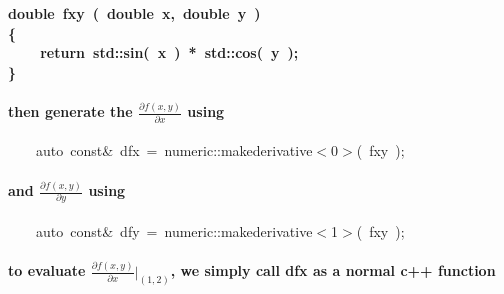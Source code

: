 \documentclass[9pt,onside,a4paper]{article}
\newcommand{\hlstd}[1]{\textcolor[rgb]{0.2,0,0.4}{#1}}
\newcommand{\hlnum}[1]{\textcolor[rgb]{0.2,0.73,0.02}{#1}}
\newcommand{\hlopt}[1]{\textcolor[rgb]{0.33,0.33,0.33}{#1}}
\newcommand{\hlkwa}[1]{\textcolor[rgb]{1,0.19,0.19}{#1}}
\newcommand{\hlkwb}[1]{\textcolor[rgb]{0.96,0.55,0.14}{#1}}
\newcommand{\hlkwc}[1]{\textcolor[rgb]{0,0,1}{#1}}
\newcommand{\hlkwd}[1]{\textcolor[rgb]{0.82,0.11,0.93}{#1}}
\begin{document}
\paragraph{ \hlstd{}\hspace*{\fill}\\
\hlkwb{double\ }\hlstd{}\hlkwd{fxy\ }\hlstd{}\hlopt{(\ }\hlstd{}\hlkwb{double\ }\hlstd{x}\hlopt{,\ }\hlstd{}\hlkwb{double\ }\hlstd{y\ }\hlopt{)}\hspace*{\fill}\\
\hlstd{}\hlopt{\{}\hspace*{\fill}\\
\hlstd{}\hlstd{\ \ \ \ }\hlstd{}\hlkwa{return\ }\hlstd{std}\hlopt{::}\hlstd{}\hlkwd{sin}\hlstd{}\hlopt{(\ }\hlstd{x\ }\hlopt{)\ {*}\ }\hlstd{std}\hlopt{::}\hlstd{}\hlkwd{cos}\hlstd{}\hlopt{(\ }\hlstd{y\ }\hlopt{);}\hspace*{\fill}\\
\hlstd{}\hlopt{\}}\hspace*{\fill}\\
}

\paragraph{then generate the $\frac{\partial{f(x,y)}}{\partial{x}}$ using\\} 

\hlstd{}\hlstd{\ \ \ \ }\hlstd{}\hlkwc{auto\ }\hlstd{}\hlkwb{const}\hlstd{}\hlopt{\&\ }\hlstd{dfx\ }\hlopt{=\ }\hlstd{numeric}\hlopt{::}\hlstd{make\textunderscore derivative}\hlopt{$<$}\hlstd{}\hlnum{0}\hlstd{}\hlopt{$>$(\ }\hlstd{fxy\ }\hlopt{);}\hspace*{\fill}\\

\paragraph{and $\frac{\partial{f(x,y)}}{\partial{y}}$ using\\}

\hlstd{}\hlstd{\ \ \ \ }\hlstd{}\hlkwc{auto\ }\hlstd{}\hlkwb{const}\hlstd{}\hlopt{\&\ }\hlstd{dfy\ }\hlopt{=\ }\hlstd{numeric}\hlopt{::}\hlstd{make\textunderscore derivative}\hlopt{$<$}\hlstd{}\hlnum{1}\hlstd{}\hlopt{$>$(\ }\hlstd{fxy\ }\hlopt{);}\hspace*{\fill}\\

\paragraph{to evaluate $\frac{\partial{f(x,y)}}{\partial{x}} \Big|_{(1,2)}$, we simply call \hlkwd{dfx} as a normal c++ function\\}
\end{document}
